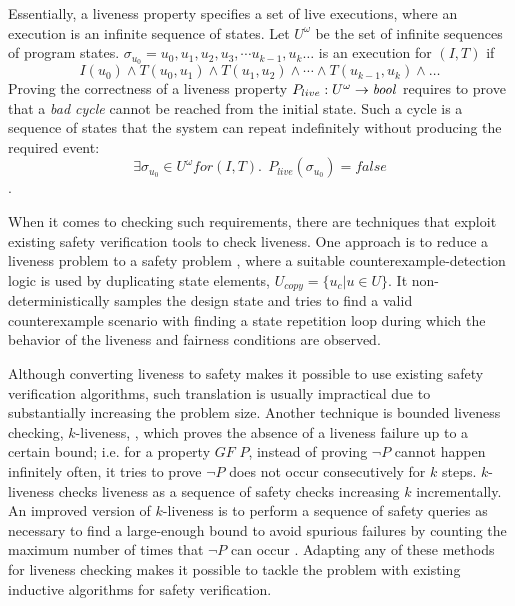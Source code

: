 Essentially, a liveness property specifies a set of live executions, where an execution is an infinite sequence of states. Let $U^\omega$ be the set of infinite sequences of
program states.  $\sigma_{u_0} = u_0, u_1, u_2, u_3, \cdots u_{k-1}, u_{k} \dots$ is an execution for $(I, T)$ if $$I(u_0) \land T(u_0, u_1) \land T(u_1, u_2) \land \cdots \land T(u_{k-1}, u_{k}) \land \dots$$
Proving the correctness of a liveness property $P_{live} : U^\omega \rightarrow \mathit{bool}$ requires to prove that
a \emph{bad cycle} cannot be reached from the initial state. Such a cycle is a sequence
of states that the system can repeat indefinitely without producing the required
event:
$$\exists \sigma_{u_0} \in U^\omega for (I, T).~~ P_{live} (\sigma_{u_0}) = false$$.

When it comes to checking such requirements, there are techniques that exploit existing safety verification tools to check liveness. One approach is to reduce a liveness problem to a safety problem \cite{Schuppan:2006}, where a suitable counterexample-detection logic is used by duplicating state elements,
 $U_{copy} = \{ u_c | u \in U \}$. It non-deterministically
samples the design state and tries to find a valid counterexample
scenario with finding a state repetition
loop during which the behavior of the liveness and fairness
conditions are observed.

Although converting liveness to safety makes it possible to use existing safety
verification algorithms, such translation is usually impractical due to substantially increasing the problem size. Another technique is bounded liveness checking, $k$-liveness, \cite{Schuppan:2006}, which proves the absence of a liveness failure up to a certain bound;
i.e. for a property $GF$ $P$, instead of proving $\neg P$ cannot happen infinitely often, it tries to prove $\neg P$ does not occur consecutively for $k$ steps. $k$-liveness checks liveness as a sequence of safety checks increasing $k$ incrementally.
An improved version of $k$-liveness is to perform a sequence of
safety queries as necessary to find a large-enough bound to
avoid spurious failures by counting the maximum number of times that $\neg P$ can occur \cite{claessen2012liveness}. Adapting any of these methods for liveness checking makes it possible to tackle the problem with existing inductive algorithms for safety verification.

